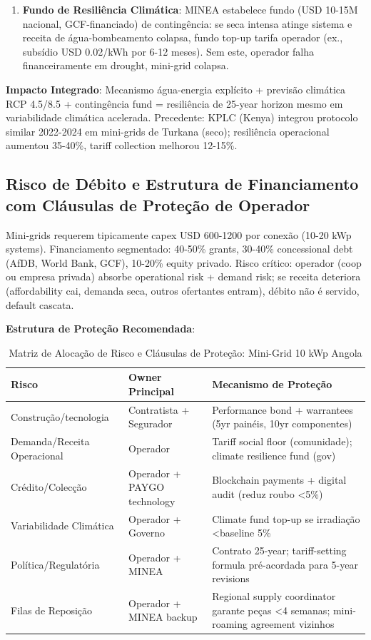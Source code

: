 \documentclass[12pt, a4paper]{article}
\begin{document}
{{{{{{{{{{{{\begin{enumerate}
\item \textbf{Fundo de Resiliência Climática}: MINEA estabelece fundo (USD 10-15M nacional, GCF-financiado) de contingência: se seca intensa atinge sistema e receita de água-bombeamento colapsa, fundo top-up tarifa operador (ex., subsídio USD 0.02/kWh por 6-12 meses). Sem este, operador falha financeiramente em drought, mini-grid colapsa.

\end{enumerate}

\textbf{Impacto Integrado}: Mecanismo água-energia explícito + previsão climática RCP 4.5/8.5 + contingência fund = resiliência de 25-year horizon mesmo em variabilidade climática acelerada. Precedente: KPLC (Kenya) integrou protocolo similar 2022-2024 em mini-grids de Turkana (seco); resiliência operacional aumentou 35-40\%, tariff collection melhorou 12-15\%.

\subsection{Risco de Débito e Estrutura de Financiamento com Cláusulas de Proteção de Operador}

Mini-grids requerem tipicamente capex USD 600-1200 por conexão (10-20 kWp systems). Financiamento segmentado: 40-50\% grants, 30-40\% concessional debt (AfDB, World Bank, GCF), 10-20\% equity privado. Risco crítico: operador (coop ou empresa privada) absorbe operational risk + demand risk; se receita deteriora (affordability cai, demanda seca, outros ofertantes entram), débito não é servido, default cascata.

\textbf{Estrutura de Proteção Recomendada}:

\begin{table}[H]
\centering
\caption{Matriz de Alocação de Risco e Cláusulas de Proteção: Mini-Grid 10 kWp Angola}
\label{tab:risk_allocation}
\small
\begin{tabular}{|l|l|l|}
\hline
\textbf{Risco} & \textbf{Owner Principal} & \textbf{Mecanismo de Proteção} \\
\hline
Construção/tecnologia & Contratista + Segurador & Performance bond + warrantees (5yr painéis, 10yr componentes) \\
\hline
Demanda/Receita Operacional & Operador & Tariff social floor (comunidade); climate resilience fund (gov) \\
\hline
Crédito/Colecção & Operador + PAYGO technology & Blockchain payments + digital audit (reduz roubo <5\%) \\
\hline
Variabilidade Climática & Operador + Governo & Climate fund top-up se irradiação <baseline 5\% \\
\hline
Política/Regulatória & Operador + MINEA & Contrato 25-year; tariff-setting formula pré-acordada para 5-year revisions \\
\hline
Filas de Reposição & Operador + MINEA backup & Regional supply coordinator garante peças <4 semanas; mini-roaming agreement vizinhos \\
\hline
\end{tabular}
\end{table}

}}}}}}}}}}}}
\end{document}
